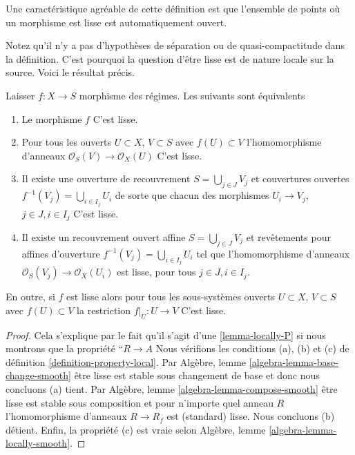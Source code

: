 \noindent
Une caractéristique agréable de cette définition est que l'ensemble de points où un morphisme est lisse est automatiquement ouvert.

\medskip\noindent
Notez qu'il n'y a pas d'hypothèses de séparation ou de quasi-compactitude dans la définition. C'est pourquoi la question d'être lisse est de nature locale sur la source. Voici le résultat précis.

\begin{lemma}

\label{lemma-smooth-characterize}

Laisser $f : X \to S$ morphisme des régimes. Les suivants sont équivalents

\begin{enumerate}

\item Le morphisme $f$ C'est lisse.
\item Pour tous les ouverts $U \subset X$, $V \subset S$
avec $f(U) \subset V$ l'homomorphisme d'anneaux
$\mathcal{O}_S(V) \to \mathcal{O}_X(U)$ C'est lisse.
\item Il existe une ouverture de recouvrement $S = \bigcup_{j \in J} V_j$
et couvertures ouvertes $f^{-1}(V_j) = \bigcup_{i \in I_j} U_i$ de sorte que chacun des morphismes $U_i \to V_j$, $j\in J, i\in I_j$
C'est lisse.
\item Il existe un recouvrement ouvert affine $S = \bigcup_{j \in J} V_j$
et revêtements pour affines d'ouverture $f^{-1}(V_j) = \bigcup_{i \in I_j} U_i$ tel que l'homomorphisme d'anneaux $\mathcal{O}_S(V_j) \to \mathcal{O}_X(U_i)$ est lisse, pour tous $j\in J, i\in I_j$.

\end{enumerate}

En outre, si $f$ est lisse alors pour tous les sous-systèmes ouverts $U \subset X$, $V \subset S$ avec $f(U) \subset V$
la restriction $f|_U : U \to V$ C'est lisse.

\end{lemma}

\begin{proof}

Cela s'explique par le fait qu'il s'agit d'une \ref{lemma-locally-P} si nous montrons que la propriété ``$R \to A$ Nous vérifions les conditions (a), (b) et (c) de définition
\ref{definition-property-local}. Par Algèbre, lemme \ref{algebra-lemma-base-change-smooth}
être lisse est stable sous changement de base et donc nous concluons (a) tient. Par Algèbre, lemme \ref{algebra-lemma-compose-smooth}
être lisse est stable sous composition et pour n'importe quel anneau
$R$ l'homomorphisme d'anneaux $R \to R_f$ est (standard) lisse. Nous concluons (b) détient. Enfin, la propriété (c) est vraie selon Algèbre, lemme \ref{algebra-lemma-locally-smooth}.

\end{proof}

